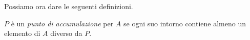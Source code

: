 % 
% 
% 
% 
% 

Possiamo ora dare le seguenti definizioni. 

\begin{newdef}{}{}
\(P\) è un \emph{punto di accumulazione} per \(A\) se ogni 
suo intorno contiene almeno un elemento di \(A\) diverso da \(P\).
\end{newdef}

